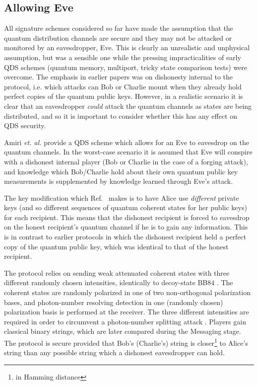 \subsection{Allowing Eve}
All signature schemes considered so far have made the assumption that the quantum distribution channels are secure and they may not be attacked or monitored by an eavesdropper, Eve. This is clearly an unrealistic and unphysical assumption, but was a sensible one while the pressing impracticalities of early QDS schemes (quantum memory, multiport, tricky state comparison tests) were overcome. The emphasis in earlier papers was on dishonesty internal to the protocol, i.e. which attacks can Bob or Charlie mount when they already hold perfect copies of the quantum public keys. However, in a realistic scenario it is clear that an eavesdropper \emph{could} attack the quantum channels as states are being distributed, and so it is important to consider whether this has any effect on QDS security.

Amiri \emph{et. al.} \cite{Amiri2016} provide a QDS scheme which allows for an Eve to eavesdrop on the quantum channels. In the worst-case scenario it is assumed that Eve will conspire with a dishonest internal player (Bob or Charlie in the case of a forging attack), and knowledge which Bob/Charlie hold about their own quantum public key measurements is supplemented by knowledge learned through Eve's attack. %

The key modification which Ref.~\cite{Amiri2016} makes is to have Alice use \emph{different} private keys (and so different sequences of quantum coherent states for her public keys) for each recipient. This means that the dishonest recipient is forced to eavesdrop on the honest recipient's quantum channel if he is to gain any information. This is in contrast to earlier protocols in which the dishonest recipient held a perfect copy of the quantum public key, which was identical to that of the honest recipient. 

The protocol relies on sending weak attenuated coherent states with three different randomly chosen intensities, identically to decoy-state BB$84$ \cite{Lo2005}. The coherent states are randomly polarized in one of two non-orthogonal polarization bases, and photon-number resolving detection in one (randomly chosen) polarization basis is performed at the receiver. The three different intensities are required in order to circumvent a photon-number splitting attack \cite{Brassard2000, Lutkenhaus2000}. Players gain classical binary strings, which are later compared during the Messaging stage. The protocol is secure provided that Bob's (Charlie's) string is closer\footnote{in Hamming distance} to Alice's string than any possible string which a dishonest eavesdropper can hold. 

